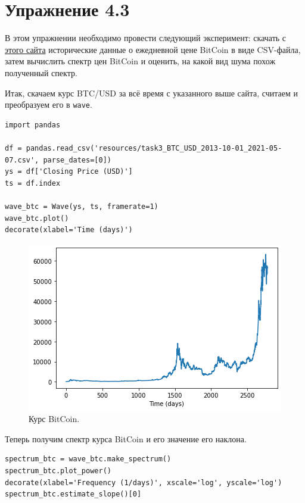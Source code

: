 \documentclass[a4paper, 14pt]{extarticle}
\begin{document}
    \newpage

    \section{Упражнение 4.3}
    \label{sec:task3}

    В этом упражнении необходимо провести следующий эксперимент: скачать с \href{https://www.coindesk.com/price/bitcoin}{этого сайта}
    исторические данные о ежедневной цене BitCoin в виде CSV-файла, затем вычислить спектр цен BitCoin и оценить, на
    какой вид шума похож полученный спектр.

    Итак, скачаем курс BTC/USD за всё время с указанного выше сайта, считаем и преобразуем его в \texttt{wave}.

    \begin{lstlisting}[caption= Перобразование файла с курсом BitCoin в \texttt{wave}., label={lst:task3_wave_btc}]
import pandas

df = pandas.read_csv('resources/task3_BTC_USD_2013-10-01_2021-05-07.csv', parse_dates=[0])
ys = df['Closing Price (USD)']
ts = df.index

wave_btc = Wave(ys, ts, framerate=1)
wave_btc.plot()
decorate(xlabel='Time (days)')  \end{lstlisting}

    \begin{figure}[h]
        \centering
        \includegraphics[width=0.7\linewidth]{resources/Images/task3_wave_btc}
        \caption{Курс BitCoin.}
        \label{fig:task3_wave_btc}
    \end{figure}

    Теперь получим спектр курса BitCoin и его значение его наклона.

    \begin{lstlisting}[caption= Получение спектра и наклона курса BtCoin., label={lst:task3_spectrum_btc}]
spectrum_btc = wave_btc.make_spectrum()
spectrum_btc.plot_power()
decorate(xlabel='Frequency (1/days)', xscale='log', yscale='log')
spectrum_btc.estimate_slope()[0]    \end{lstlisting}
\end{document}
